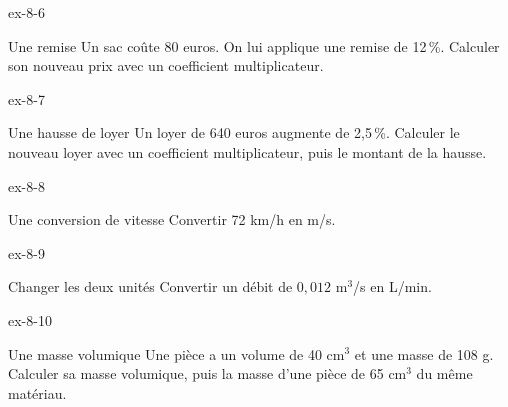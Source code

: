 \begin{blocLivre}{ex-8-6}\begin{exercice}[2]{Une remise}
Un sac coûte 80 euros. On lui applique une remise de 12\,\%. Calculer son nouveau prix avec un coefficient multiplicateur.
\end{exercice}\end{blocLivre}
\begin{blocLivre}{ex-8-7}\begin{exercice}[2]{Une hausse de loyer}
Un loyer de 640 euros augmente de 2,5\,\%. Calculer le nouveau loyer avec un coefficient multiplicateur, puis le montant de la hausse.
\end{exercice}\end{blocLivre}
\begin{blocLivre}{ex-8-8}\begin{exercice}[2]{Une conversion de vitesse}
Convertir 72 km/h en m/s.
\end{exercice}\end{blocLivre}
\begin{blocLivre}{ex-8-9}\begin{exercice}[2]{Changer les deux unités}
Convertir un débit de $0{,}012$ m$^3$/s en L/min.
\end{exercice}\end{blocLivre}
\begin{blocLivre}{ex-8-10}\begin{exercice}[2]{Une masse volumique}
Une pièce a un volume de 40 cm$^3$ et une masse de 108 g. Calculer sa masse volumique, puis la masse d’une pièce de 65 cm$^3$ du même matériau.
\end{exercice}\end{blocLivre}

